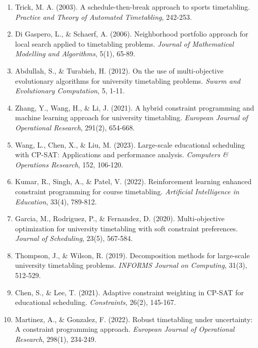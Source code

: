 \documentclass[12pt,a4paper]{article}
\begin{document}
\begin{enumerate}
\item Trick, M. A. (2003). A schedule-then-break approach to sports timetabling. \textit{Practice and Theory of Automated Timetabling}, 242-253.

\item Di Gaspero, L., \& Schaerf, A. (2006). Neighborhood portfolio approach for local search applied to timetabling problems. \textit{Journal of Mathematical Modelling and Algorithms}, 5(1), 65-89.

\item Abdullah, S., \& Turabieh, H. (2012). On the use of multi-objective evolutionary algorithms for university timetabling problems. \textit{Swarm and Evolutionary Computation}, 5, 1-11.

\item Zhang, Y., Wang, H., \& Li, J. (2021). A hybrid constraint programming and machine learning approach for university timetabling. \textit{European Journal of Operational Research}, 291(2), 654-668.

\item Wang, L., Chen, X., \& Liu, M. (2023). Large-scale educational scheduling with CP-SAT: Applications and performance analysis. \textit{Computers \& Operations Research}, 152, 106-120.

\item Kumar, R., Singh, A., \& Patel, V. (2022). Reinforcement learning enhanced constraint programming for course timetabling. \textit{Artificial Intelligence in Education}, 33(4), 789-812.

\item Garcia, M., Rodriguez, P., \& Fernandez, D. (2020). Multi-objective optimization for university timetabling with soft constraint preferences. \textit{Journal of Scheduling}, 23(5), 567-584.

\item Thompson, J., \& Wilson, R. (2019). Decomposition methods for large-scale university timetabling problems. \textit{INFORMS Journal on Computing}, 31(3), 512-529.

\item Chen, S., \& Lee, T. (2021). Adaptive constraint weighting in CP-SAT for educational scheduling. \textit{Constraints}, 26(2), 145-167.

\item Martinez, A., \& Gonzalez, F. (2022). Robust timetabling under uncertainty: A constraint programming approach. \textit{European Journal of Operational Research}, 298(1), 234-249.
\end{enumerate}
\end{document}
